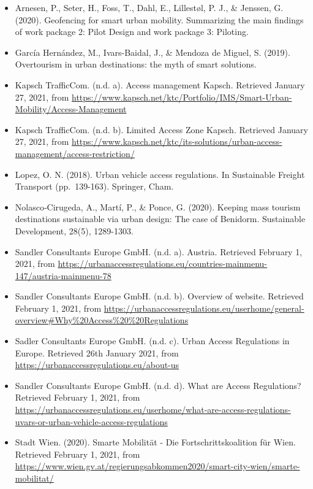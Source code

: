 \documentclass[
]{book}
\providecommand{\tightlist}{%
  \setlength{\itemsep}{0pt}\setlength{\parskip}{0pt}}
\begin{document}
\begin{itemize}
\tightlist
\item
  Arnesen, P., Seter, H., Foss, T., Dahl, E., Lillestøl, P. J., \& Jenssen, G. (2020). Geofencing for smart urban mobility. Summarizing the main findings of work package 2: Pilot Design and work package 3: Piloting.
\item
  García Hernández, M., Ivars-Baidal, J., \& Mendoza de Miguel, S. (2019). Overtourism in urban destinations: the myth of smart solutions.
\item
  Kapsch TrafficCom. (n.d. a). Access management \textbar{} Kapsch. Retrieved January 27, 2021, from \url{https://www.kapsch.net/ktc/Portfolio/IMS/Smart-Urban-Mobility/Access-Management}
\item
  Kapsch TrafficCom. (n.d. b). Limited Access Zone \textbar{} Kapsch. Retrieved January 27, 2021, from \url{https://www.kapsch.net/ktc/its-solutions/urban-access-management/access-restriction/}
\item
  Lopez, O. N. (2018). Urban vehicle access regulations. In Sustainable Freight Transport (pp.~139-163). Springer, Cham.
\item
  Nolasco‐Cirugeda, A., Martí, P., \& Ponce, G. (2020). Keeping mass tourism destinations sustainable via urban design: The case of Benidorm. Sustainable Development, 28(5), 1289-1303.
\item
  Sandler Consultants Europe GmbH. (n.d. a). Austria. Retrieved February 1, 2021, from \url{https://urbanaccessregulations.eu/countries-mainmenu-147/austria-mainmenu-78}
\item
  Sandler Consultants Europe GmbH. (n.d. b). Overview of website. Retrieved February 1, 2021, from \url{https://urbanaccessregulations.eu/userhome/general-overview\#Why\%20Access\%20\%20Regulations}\\
\item
  Sadler Consultants Europe GmbH. (n.d. c). Urban Access Regulations in Europe. Retrieved 26th January 2021, from \url{https://urbanaccessregulations.eu/about-us}
\item
  Sandler Consultants Europe GmbH. (n.d. d). What are Access Regulations? Retrieved February 1, 2021, from \url{https://urbanaccessregulations.eu/userhome/what-are-access-regulations-uvars-or-urban-vehicle-access-regulations}
\item
  Stadt Wien. (2020). Smarte Mobilität - Die Fortschrittskoalition für Wien. Retrieved February 1, 2021, from \url{https://www.wien.gv.at/regierungsabkommen2020/smart-city-wien/smarte-mobilitat/}
\end{itemize}
\end{document}
